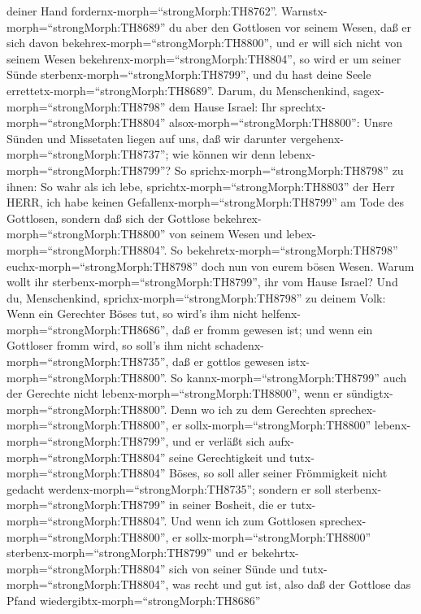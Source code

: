 deiner Hand fordernx-morph=``strongMorph:TH8762''. 
Warnstx-morph=``strongMorph:TH8689'' du aber den Gottlosen vor seinem
Wesen, daß er sich davon bekehrex-morph=``strongMorph:TH8800'', und er
will sich nicht von seinem Wesen bekehrenx-morph=``strongMorph:TH8804'',
so wird er um seiner Sünde sterbenx-morph=``strongMorph:TH8799'', und du
hast deine Seele errettetx-morph=``strongMorph:TH8689''. 
Darum, du Menschenkind, sagex-morph=``strongMorph:TH8798'' dem Hause
Israel: Ihr sprechtx-morph=``strongMorph:TH8804''
alsox-morph=``strongMorph:TH8800'': Unsre Sünden und Missetaten liegen
auf uns, daß wir darunter vergehenx-morph=``strongMorph:TH8737''; wie
können wir denn lebenx-morph=``strongMorph:TH8799''?  So
sprichx-morph=``strongMorph:TH8798'' zu ihnen: So wahr als ich lebe,
sprichtx-morph=``strongMorph:TH8803'' der Herr HERR, ich habe keinen
Gefallenx-morph=``strongMorph:TH8799'' am Tode des Gottlosen, sondern
daß sich der Gottlose bekehrex-morph=``strongMorph:TH8800'' von seinem
Wesen und lebex-morph=``strongMorph:TH8804''. So
bekehretx-morph=``strongMorph:TH8798''
euchx-morph=``strongMorph:TH8798'' doch nun von eurem bösen Wesen. Warum
wollt ihr sterbenx-morph=``strongMorph:TH8799'', ihr vom Hause Israel?
 Und du, Menschenkind, sprichx-morph=``strongMorph:TH8798''
zu deinem Volk: Wenn ein Gerechter Böses tut, so wird's ihm nicht
helfenx-morph=``strongMorph:TH8686'', daß er fromm gewesen ist; und wenn
ein Gottloser fromm wird, so soll's ihm nicht
schadenx-morph=``strongMorph:TH8735'', daß er gottlos gewesen
istx-morph=``strongMorph:TH8800''. So kannx-morph=``strongMorph:TH8799''
auch der Gerechte nicht lebenx-morph=``strongMorph:TH8800'', wenn er
sündigtx-morph=``strongMorph:TH8800''.  Denn wo ich zu dem
Gerechten sprechex-morph=``strongMorph:TH8800'', er
sollx-morph=``strongMorph:TH8800'' lebenx-morph=``strongMorph:TH8799'',
und er verläßt sich aufx-morph=``strongMorph:TH8804'' seine
Gerechtigkeit und tutx-morph=``strongMorph:TH8804'' Böses, so soll aller
seiner Frömmigkeit nicht gedacht werdenx-morph=``strongMorph:TH8735'';
sondern er soll sterbenx-morph=``strongMorph:TH8799'' in seiner Bosheit,
die er tutx-morph=``strongMorph:TH8804''.  Und wenn ich zum
Gottlosen sprechex-morph=``strongMorph:TH8800'', er
sollx-morph=``strongMorph:TH8800'' sterbenx-morph=``strongMorph:TH8799''
und er bekehrtx-morph=``strongMorph:TH8804'' sich von seiner Sünde und
tutx-morph=``strongMorph:TH8804'', was recht und gut ist, 
also daß der Gottlose das Pfand wiedergibtx-morph=``strongMorph:TH8686''
